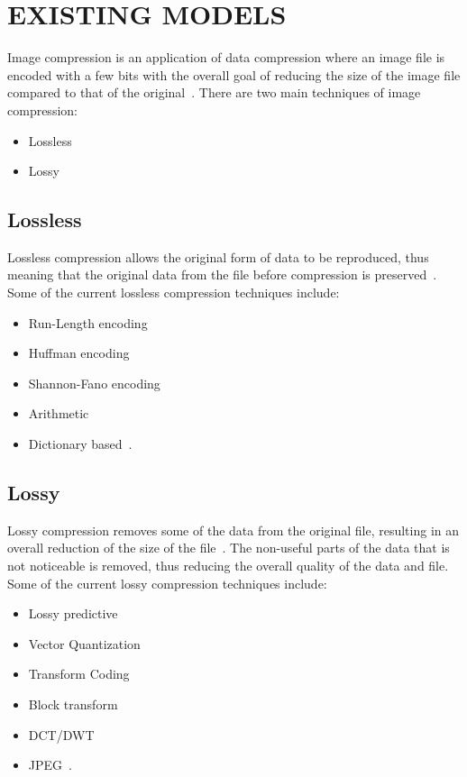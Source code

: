 \documentclass[10pt,twocolumn, a4paper]{witseiepaper}
\begin{document}
\section{EXISTING MODELS}
\label{sec: Existing Models}
Image compression is an application of data compression where an image file is encoded with a few bits with the overall goal of reducing the size of the image file compared to that of the original~\cite{ImageComp}. There are two main techniques of image compression:
\begin{itemize}
\item Lossless
\item Lossy
\end{itemize}

\subsection{Lossless}
\label{sec: Lossless}
Lossless compression allows the original form of data to be reproduced, thus meaning that the original data from the file before compression is preserved~\cite{Loss}. Some of the current lossless compression techniques include:
\begin{itemize}
\item Run-Length encoding
\item Huffman encoding
\item Shannon-Fano encoding
\item Arithmetic
\item Dictionary based~\cite{DiffTech}.
\end{itemize}


\subsection{Lossy}
\label{sec: Lossy}
Lossy compression removes some of the data from the original file, resulting in an overall reduction of the size of the file~\cite{Loss}. The non-useful parts of the data that is not noticeable is removed, thus reducing the overall quality of the data and file. Some of the current lossy compression techniques include:
\begin{itemize}
\item Lossy predictive
\item Vector Quantization
\item Transform Coding
\item Block transform
\item DCT/DWT
\item JPEG~\cite{DiffTech}.
\end{itemize}
\end{document}
